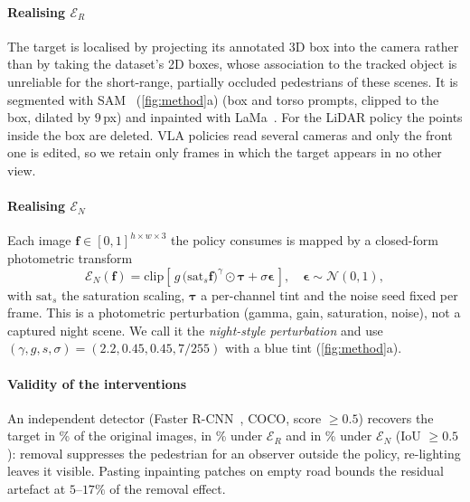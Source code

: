 \paragraph{Realising $\mathcal{E}_R$}
The target is localised by projecting its annotated 3D box into the camera rather than by taking the
dataset's 2D boxes, whose association to the tracked object is unreliable for the short-range,
partially occluded pedestrians of these scenes. It is segmented with SAM~\cite{kirillov2023sam} (\cref{fig:method}a) (box
and torso prompts, clipped to the box, dilated by $9$\,px) and inpainted with
LaMa~\cite{suvorov2022lama}. For the LiDAR policy the points inside the box are deleted. VLA policies read several cameras and only the front one is edited, so we retain only frames in which the target
appears in no other view.

\paragraph{Realising $\mathcal{E}_N$}
Each image $\mathbf{f}\in[0,1]^{h\times w\times3}$ the policy consumes is mapped by a closed-form
photometric transform
\begin{equation}
\mathcal{E}_{N}(\mathbf{f})=\mathrm{clip}\!\left[\,g\,\big(\mathrm{sat}_{s}\mathbf{f}\big)^{\gamma}\odot\boldsymbol\tau+\sigma\boldsymbol\epsilon\,\right],
\quad \boldsymbol\epsilon\sim\mathcal{N}(0,1),
\label{eq:relight}
\end{equation}
with $\mathrm{sat}_s$ the saturation scaling, $\boldsymbol\tau$ a per-channel tint and the noise seed
fixed per frame. This is a photometric perturbation (gamma, gain, saturation, noise), not a captured night scene. We call it the \emph{night-style perturbation} and use $(\gamma,g,s,\sigma)=(2.2,0.45,0.45,7/255)$ with a blue tint (\cref{fig:method}a).

\paragraph{Validity of the interventions}
An independent detector (Faster R-CNN~\cite{ren2015faster}, COCO, score $\ge0.5$) recovers the target
in \NumDetOrig\% of the original images, in \NumDetStill\% under $\mathcal{E}_R$ and in
\NumDetNight\% under $\mathcal{E}_N$ (IoU $\ge0.5$): removal suppresses the pedestrian for an observer
outside the policy, re-lighting leaves it visible. Pasting inpainting patches on empty road bounds the
residual artefact at $5$--$17\%$ of the removal effect.

